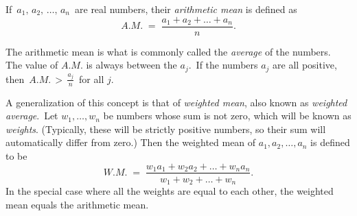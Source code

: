 \documentclass{article}
\begin{document}
If\, $a_1,\,a_2,\,\ldots,\,a_n$\, are real numbers, their \emph{arithmetic mean} is defined as
$$A.M. \;=\; \frac{a_1+a_2+\ldots+a_n}{n}.$$

The arithmetic mean is what is commonly called the \emph{average} of the numbers.\, The value of $A.M.$ is always between the  $a_j$.\, If the numbers $a_j$ are all positive, then\, $A.M. \,>\, \frac{a_j}{n}$\, for all $j$.

A generalization of this  concept is that of \emph{weighted mean}, also known as
\emph {weighted average}.\, Let $w_1, \ldots, w_n$ be  numbers whose sum is not zero,
which will be known as \emph{weights}.  (Typically, these will be strictly 
positive numbers, so their sum will automatically differ from zero.)  Then the
weighted mean of $a_1,a_2,\ldots,a_n$ is defined to be
$$W.M. \;=\; 
\frac{w_1 a_1 + w_2 a_2 + \ldots + w_n a_n}{w_1\!+\!w_2\!+\!\ldots+\!w_n}.$$
In the special case where all the weights are equal to each other, the weighted mean equals the arithmetic mean.
\end{document}
